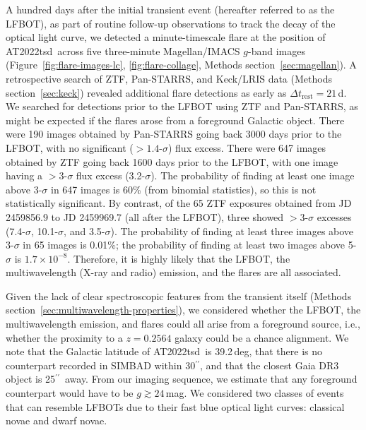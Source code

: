 \documentclass{nature_plusfigure}
\newcommand{\at}{AT2022tsd}
\newcommand{\arcsec}{$^{\prime\prime}$}
\begin{document}
\begin{methods}
A hundred days after the initial transient event (hereafter referred to as the LFBOT), as part of routine follow-up observations to track the decay of the optical light curve, we detected\cite{Ho2022_Astronote_Flares} a minute-timescale flare at the position of \at\ across five three-minute Magellan/IMACS $g$-band images (Figure~\ref{fig:flare-images-lc}, \ref{fig:flare-collage}, Methods section~\ref{sec:magellan}). A retrospective search of ZTF, Pan-STARRS, and Keck/LRIS data (Methods section~\ref{sec:keck}) revealed additional flare detections as early as $\Delta t_\mathrm{rest}=21\,$d. We searched for detections prior to the LFBOT using ZTF and Pan-STARRS, as might be expected if the flares arose from a foreground Galactic object. There were 190 images obtained by Pan-STARRS going back 3000 days prior to the LFBOT, with no significant ($>1.4$-$\sigma$) flux excess\cite{Fulton2022}. There were 647 images obtained by ZTF going back 1600 days prior to the LFBOT, with one image having a $>3$-$\sigma$ flux excess (3.2-$\sigma$). The probability of finding at least one image above 3-$\sigma$ in 647 images is 60\% (from binomial statistics), so this is not statistically significant. By contrast, of the 65 ZTF exposures obtained from JD 2459856.9 to JD 2459969.7 (all after the LFBOT), three showed $>3$-$\sigma$ excesses (7.4-$\sigma$, 10.1-$\sigma$, and 3.5-$\sigma$). The probability of finding at least three images above 3-$\sigma$ in 65 images is 0.01\%; the probability of finding at least two images above 5-$\sigma$ is $1.7\times10^{-8}$. Therefore, it is highly likely that the LFBOT, the multiwavelength (X-ray and radio) emission, and the flares are all associated. 


Given the lack of clear spectroscopic features from the transient itself (Methods section~\ref{sec:multiwavelength-properties}), we considered whether the LFBOT, the multiwavelength emission, and flares could all arise from a foreground source, i.e., whether the proximity to a $z=0.2564$ galaxy could be a chance alignment. 
We note that the Galactic latitude of \at\ is 39.2\,deg, that there is no counterpart recorded in SIMBAD within 30\arcsec, and that the closest Gaia DR3 object is 25\arcsec\ away. From our imaging sequence, we estimate that any foreground counterpart would have to be $g \gtrsim 24\,$mag. We considered two classes of events that can resemble LFBOTs due to their fast blue optical light curves: classical novae and dwarf novae.


\end{methods}
\end{document}
